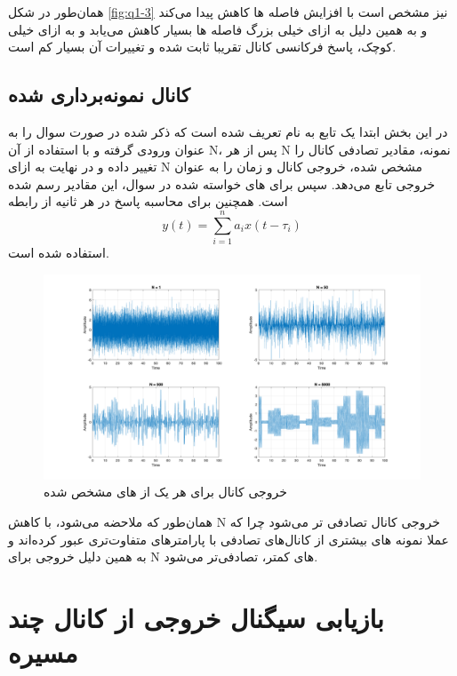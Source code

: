 \documentclass[10pt]{article}
\begin{document}
\noindent
همان‌طور در شکل
 \ref{fig:q1-3}
 نیز مشخص است با افزایش 
 فاصله ها کاهش پیدا می‌کند و به همین دلیل به ازای 
 خیلی بزرگ فاصله ها بسیار کاهش می‌یابد و به ازای 
 خیلی کوچک، پاسخ فرکانسی کانال تقریبا ثابت شده و تغییرات آن بسیار کم است.
 \newpage
 \subsection{کانال نمونه‌برداری شده}
 در این بخش ابتدا یک تابع به نام 
 تعریف شده است که 
 ذکر شده در صورت سوال را به عنوان ورودی گرفته و با استفاده از آن N، پس از هر N نمونه، مقادیر تصادفی کانال را تغییر داده و در نهایت به ازای N مشخص شده، خروجی کانال و زمان را به عنوان خروجی تابع می‌دهد. سپس برای 
 های خواسته شده در سوال، این مقادیر رسم شده است. همچنین برای محاسبه پاسخ در هر ثانیه از رابطه 
 \[y(t) = \sum_{i=1}^{n} a_i x(t-\tau_i)\]
 استفاده شده است.
 \begin{figure}[h]
 	\centering
 	\includegraphics[width=1\linewidth]{../pics/q1-4}
 	\caption{خروجی کانال برای هر یک از  
 های مشخص شده}
 	\label{fig:q1-4}
 \end{figure}

\noindent
همان‌طور که ملاحضه می‌شود، با کاهش N خروجی کانال تصادفی تر می‌شود چرا که عملا نمونه های بیشتری از کانال‌های تصادفی با پارامترهای متفاوت‌تری عبور کرده‌اند و به همین دلیل خروجی برای N های کمتر، تصادفی‌تر می‌شود.
 \newpage
 \section{بازیابی سیگنال خروجی از کانال چند مسیره}
\end{document}
